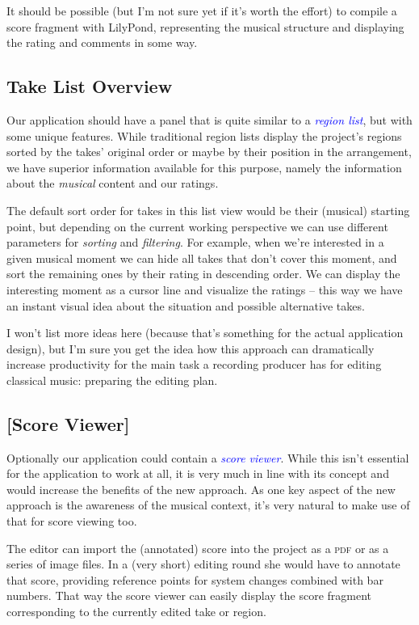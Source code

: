 \documentclass[11pt,a4paper]{article}
\newcommand*{\term}[1]{\textcolor{blue}{\emph{#1}}}
\begin{document}
It should be possible (but I'm not sure yet if it's worth the effort) to compile
a score fragment with LilyPond, representing the musical structure and
displaying the rating and comments in some way.


\subsection{Take List Overview}
Our application should have a panel that is quite similar to a \term{region
list}, but with some unique features.
While traditional region lists display the project's regions sorted by the
takes' original order or maybe by their position in the arrangement, we have
superior information available for this purpose, namely the information about the
\emph{musical} content and our ratings.

The default sort order for takes in this list view would be their (musical)
starting point, but depending on the current working perspective we can use
different parameters for \emph{sorting} and \emph{filtering}.
For example, when we're interested in a given musical moment we can hide all
takes that don't cover this moment, and sort the remaining ones by their rating
in descending order.
We can display the interesting moment as a cursor line and visualize the ratings
-- this way we have an instant visual idea about the situation and possible
alternative takes.

I won't list more ideas here (because that's something for the actual
application design), but I'm sure you get the idea how this approach can
dramatically increase productivity for the main task a recording producer has
for editing classical music: preparing the editing plan.

\subsection{[Score Viewer]}
Optionally our application could contain a \term{score viewer}.
While this isn't essential for the application to work at all, it is very much in
line with its concept and would increase the benefits of the new approach.
As one key aspect of the new approach is the awareness of the musical context,
it's very natural to make use of that for score viewing too.

The editor can import the (annotated) score into the project as a \textsc{pdf} or as a
series of image files.
In a (very short) editing round she would have to annotate that score, providing
reference points for system changes combined with bar numbers.
That way the score viewer can easily display the score fragment corresponding to
the currently edited take or region.
\end{document}
